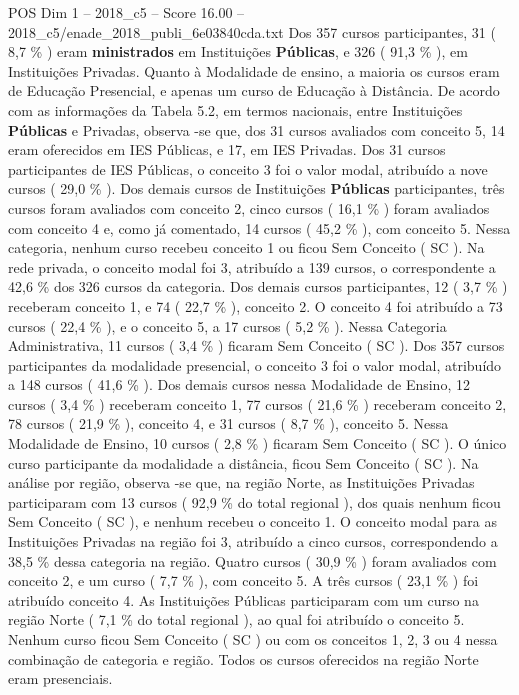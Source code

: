 \begin{textsample}{POS Dim 1 – 2018\_c5 – Score 16.00 – 2018\_c5/enade\_2018\_publi\_6e03840cda.txt}
Dos 357 cursos participantes, 31 ( 8,7 \% ) eram \textbf{ministrados} em Instituições \textbf{Públicas}, e 326 ( 91,3 \% ), em Instituições Privadas.
Quanto à Modalidade de ensino, a maioria os cursos eram de Educação Presencial, e apenas um curso de Educação à Distância.
De acordo com as informações da Tabela 5.2, em termos nacionais, entre Instituições \textbf{Públicas} e Privadas, observa -se que, dos 31 cursos avaliados com conceito 5, 14 eram oferecidos em IES Públicas, e 17, em IES Privadas.
Dos 31 cursos participantes de IES Públicas, o conceito 3 foi o valor modal, atribuído a nove cursos ( 29,0 \% ).
Dos demais cursos de Instituições \textbf{Públicas} participantes, três cursos foram avaliados com conceito 2, cinco cursos ( 16,1 \% ) foram avaliados com conceito 4 e, como já comentado, 14 cursos ( 45,2 \% ), com conceito 5.
Nessa categoria, nenhum curso recebeu conceito 1 ou ficou Sem Conceito ( SC ).
Na rede privada, o conceito modal foi 3, atribuído a 139 cursos, o correspondente a 42,6 \% dos 326 cursos da categoria.
Dos demais cursos participantes, 12 ( 3,7 \% ) receberam conceito 1, e 74 ( 22,7 \% ), conceito 2.
O conceito 4 foi atribuído a 73 cursos ( 22,4 \% ), e o conceito 5, a 17 cursos ( 5,2 \% ).
Nessa Categoria Administrativa, 11 cursos ( 3,4 \% ) ficaram Sem Conceito ( SC ).
Dos 357 cursos participantes da modalidade presencial, o conceito 3 foi o valor modal, atribuído a 148 cursos ( 41,6 \% ).
Dos demais cursos nessa Modalidade de Ensino, 12 cursos ( 3,4 \% ) receberam conceito 1, 77 cursos ( 21,6 \% ) receberam conceito 2, 78 cursos ( 21,9 \% ), conceito 4, e 31 cursos ( 8,7 \% ), conceito 5.
Nessa Modalidade de Ensino, 10 cursos ( 2,8 \% ) ficaram Sem Conceito ( SC ).
O único curso participante da modalidade a distância, ficou Sem Conceito ( SC ).
Na análise por região, observa -se que, na região Norte, as Instituições Privadas participaram com 13 cursos ( 92,9 \% do total regional ), dos quais nenhum ficou Sem Conceito ( SC ), e nenhum recebeu o conceito 1.
O conceito modal para as Instituições Privadas na região foi 3, atribuído a cinco cursos, correspondendo a 38,5 \% dessa categoria na região.
Quatro cursos ( 30,9 \% ) foram avaliados com conceito 2, e um curso ( 7,7 \% ), com conceito 5.
A três cursos ( 23,1 \% ) foi atribuído conceito 4.
As Instituições Públicas participaram com um curso na região Norte ( 7,1 \% do total regional ), ao qual foi atribuído o conceito 5.
Nenhum curso ficou Sem Conceito ( SC ) ou com os conceitos 1, 2, 3 ou 4 nessa combinação de categoria e região.
Todos os cursos oferecidos na região Norte eram presenciais.

\end{textsample}
